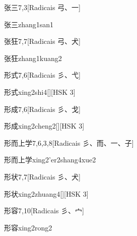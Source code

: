 \begin{entry}{张三}{7,3}[Radicais ⼸、⼀]
  \begin{phonetics}{张三}{zhang1san1}
  \end{phonetics}
\end{entry}

\begin{entry}{张狂}{7,7}[Radicais ⼸、⽝]
  \begin{phonetics}{张狂}{zhang1kuang2}
  \end{phonetics}
\end{entry}

\begin{entry}{形式}{7,6}[Radicais ⼺、⼷]
  \begin{phonetics}{形式}{xing2shi4}[][HSK 3]
  \end{phonetics}
\end{entry}

\begin{entry}{形成}{7,6}[Radicais ⼺、⼽]
  \begin{phonetics}{形成}{xing2cheng2}[][HSK 3]
  \end{phonetics}
\end{entry}

\begin{entry}{形而上学}{7,6,3,8}[Radicais ⼺、⽽、⼀、⼦]
  \begin{phonetics}{形而上学}{xing2'er2shang4xue2}
  \end{phonetics}
\end{entry}

\begin{entry}{形状}{7,7}[Radicais ⼺、⽝]
  \begin{phonetics}{形状}{xing2zhuang4}[][HSK 3]
  \end{phonetics}
\end{entry}

\begin{entry}{形容}{7,10}[Radicais ⼺、⼧]
  \begin{phonetics}{形容}{xing2rong2}
  \end{phonetics}
\end{entry}

